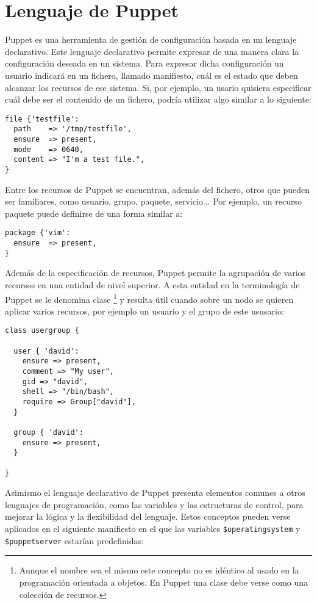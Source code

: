 \chapter{Lenguaje de Puppet}
\label{anx:puppet-language}

Puppet es una herramienta de gestión de configuración basada en un lenguaje declarativo. Este lenguaje declarativo permite expresar de una manera clara la configuración deseada en un sistema. Para expresar dicha configuración un usuario indicará en un fichero, llamado manifiesto, cuál es el estado que deben alcanzar los recursos de ese sistema. Si, por ejemplo, un usario quisiera especificar cuál debe ser el contenido de un fichero, podría utilizar algo similar a lo siguiente:

\begin{lstlisting}
file {'testfile':
  path    => '/tmp/testfile',
  ensure  => present,
  mode    => 0640,
  content => "I'm a test file.",
}
\end{lstlisting}

Entre los recursos de Puppet se encuentran, además del fichero, otros que pueden ser familiares, como usuario, grupo, paquete, servicio... Por ejemplo, un recurso paquete puede definirse de una forma similar a:

\begin{lstlisting}
package {'vim':
  ensure  => present,
}
\end{lstlisting}

Además de la especificación de recursos, Puppet permite la agrupación de varios recursos en una entidad de nivel superior. A esta entidad en la terminología de Puppet se le denomina clase \footnote[1]{Aunque el nombre sea el mismo este concepto no es idéntico al usado en la programación orientada a objetos. En Puppet una clase debe verse como una colección de recursos.} y resulta útil cuando sobre un nodo se quieren aplicar varios recursos, por ejemplo un usuario y el grupo de este ususario:

\begin{lstlisting}
class usergroup {

  user { 'david':
    ensure => present,
    comment => "My user",
    gid => "david",
    shell => "/bin/bash",
    require => Group["david"],
  }

  group { 'david':
    ensure => present,
  }

}
\end{lstlisting}

Asimismo el lenguaje declarativo de Puppet presenta elementos comunes a otros lenguajes de programación, como las variables y las estructuras de control, para mejorar la lógica y la flexibilidad del lenguaje. Estos conceptos pueden verse aplicados en el siguiente manifiesto en el que las variables \texttt{\$operatingsystem} y \texttt{\$puppetserver} estarían predefinidas:

